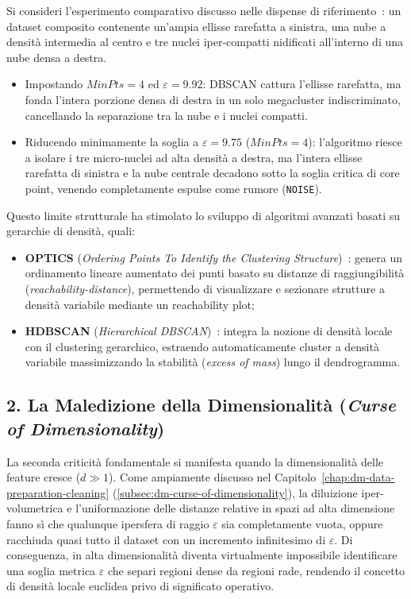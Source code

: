 Si consideri l'esperimento comparativo discusso nelle dispense di riferimento~\cite{tan2018}: un dataset composito contenente un'ampia ellisse rarefatta a sinistra, una nube a densità intermedia al centro e tre nuclei iper-compatti nidificati all'interno di una nube densa a destra.
\begin{itemize}
    \item Impostando $MinPts = 4$ ed $\varepsilon = 9.92$: DBSCAN cattura l'ellisse rarefatta, ma fonda l'intera porzione densa di destra in un solo megacluster indiscriminato, cancellando la separazione tra la nube e i nuclei compatti.
    \item Riducendo minimamente la soglia a $\varepsilon = 9.75$ ($MinPts = 4$): l'algoritmo riesce a isolare i tre micro-nuclei ad alta densità a destra, ma l'intera ellisse rarefatta di sinistra e la nube centrale decadono sotto la soglia critica di core point, venendo completamente espulse come rumore (\texttt{NOISE}).
\end{itemize}

Questo limite strutturale ha stimolato lo sviluppo di algoritmi avanzati basati su gerarchie di densità, quali:
\begin{itemize}
    \item \textbf{OPTICS} (\textit{Ordering Points To Identify the Clustering Structure})~\cite{ankerst1999}: genera un ordinamento lineare aumentato dei punti basato su distanze di raggiungibilità (\textit{reachability-distance}), permettendo di visualizzare e sezionare strutture a densità variabile mediante un reachability plot;
    \item \textbf{HDBSCAN} (\textit{Hierarchical DBSCAN})~\cite{campello2015}: integra la nozione di densità locale con il clustering gerarchico, estraendo automaticamente cluster a densità variabile massimizzando la stabilità (\textit{excess of mass}) lungo il dendrogramma.
\end{itemize}

\FloatBarrier
\subsection{2. La Maledizione della Dimensionalità (\textit{Curse of Dimensionality})}

La seconda criticità fondamentale si manifesta quando la dimensionalità delle feature cresce ($d \gg 1$). Come ampiamente discusso nel Capitolo~\ref{chap:dm-data-preparation-cleaning} (\autoref{subsec:dm-curse-of-dimensionality}), la diluizione iper-volumetrica e l'uniformazione delle distanze relative in spazi ad alta dimensione fanno sì che qualunque ipersfera di raggio $\varepsilon$ sia completamente vuota, oppure racchiuda quasi tutto il dataset con un incremento infinitesimo di $\varepsilon$. Di conseguenza, in alta dimensionalità diventa virtualmente impossibile identificare una soglia metrica $\varepsilon$ che separi regioni dense da regioni rade, rendendo il concetto di densità locale euclidea privo di significato operativo.

